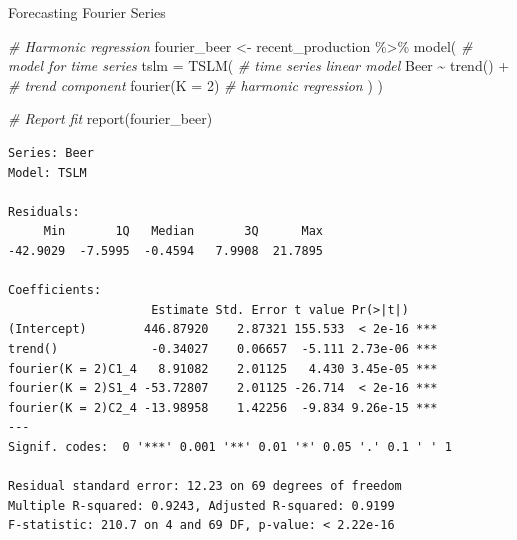 \documentclass[
  ignorenonframetext,
]{beamer}
\newenvironment{Shaded}{\begin{snugshade}}{\end{snugshade}}
\newcommand{\AttributeTok}[1]{\textcolor[rgb]{0.77,0.63,0.00}{#1}}
\newcommand{\CommentTok}[1]{\textcolor[rgb]{0.56,0.35,0.01}{\textit{#1}}}
\newcommand{\DecValTok}[1]{\textcolor[rgb]{0.00,0.00,0.81}{#1}}
\newcommand{\FunctionTok}[1]{\textcolor[rgb]{0.00,0.00,0.00}{#1}}
\newcommand{\NormalTok}[1]{#1}
\newcommand{\OtherTok}[1]{\textcolor[rgb]{0.56,0.35,0.01}{#1}}
\newcommand{\SpecialCharTok}[1]{\textcolor[rgb]{0.00,0.00,0.00}{#1}}
\begin{document}
\begin{frame}[fragile]{Forecasting \textbar{} \small Fourier Series}
\protect\hypertarget{forecasting-fourier-series-2}{}
\tiny

\normalfont

\tiny

\begin{Shaded}
\begin{Highlighting}[]
\CommentTok{\# Harmonic regression}
\NormalTok{fourier\_beer }\OtherTok{\textless{}{-}}\NormalTok{ recent\_production }\SpecialCharTok{\%\textgreater{}\%}
  \FunctionTok{model}\NormalTok{( }\CommentTok{\# model for time series}
    \AttributeTok{tslm =} \FunctionTok{TSLM}\NormalTok{( }\CommentTok{\# time series linear model}
\NormalTok{      Beer }\SpecialCharTok{\textasciitilde{}} \FunctionTok{trend}\NormalTok{() }\SpecialCharTok{+} \CommentTok{\# trend component}
        \FunctionTok{fourier}\NormalTok{(}\AttributeTok{K =} \DecValTok{2}\NormalTok{) }\CommentTok{\# harmonic regression}
\NormalTok{    )}
\NormalTok{  )}

\CommentTok{\# Report fit}
\FunctionTok{report}\NormalTok{(fourier\_beer)}
\end{Highlighting}
\end{Shaded}

\begin{verbatim}
Series: Beer 
Model: TSLM 

Residuals:
     Min       1Q   Median       3Q      Max 
-42.9029  -7.5995  -0.4594   7.9908  21.7895 

Coefficients:
                    Estimate Std. Error t value Pr(>|t|)    
(Intercept)        446.87920    2.87321 155.533  < 2e-16 ***
trend()             -0.34027    0.06657  -5.111 2.73e-06 ***
fourier(K = 2)C1_4   8.91082    2.01125   4.430 3.45e-05 ***
fourier(K = 2)S1_4 -53.72807    2.01125 -26.714  < 2e-16 ***
fourier(K = 2)C2_4 -13.98958    1.42256  -9.834 9.26e-15 ***
---
Signif. codes:  0 '***' 0.001 '**' 0.01 '*' 0.05 '.' 0.1 ' ' 1

Residual standard error: 12.23 on 69 degrees of freedom
Multiple R-squared: 0.9243, Adjusted R-squared: 0.9199
F-statistic: 210.7 on 4 and 69 DF, p-value: < 2.22e-16
\end{verbatim}

\normalfont
\end{frame}
\end{document}
